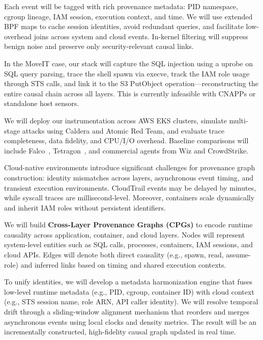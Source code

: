 Each event will be tagged with rich provenance metadata: PID namespace, cgroup lineage, IAM session, execution context, and time. We will use extended BPF maps to cache session identities, avoid redundant queries, and facilitate low-overhead joins across system and cloud events. In-kernel filtering will suppress benign noise and preserve only security-relevant causal links.

In the MoveIT case, our stack will capture the SQL injection using a uprobe on SQL query parsing, trace the shell spawn via execve, track the IAM role usage through STS calls, and link it to the S3 PutObject operation—reconstructing the entire causal chain across all layers. This is currently infeasible with CNAPPs or standalone host sensors.

We will deploy our instrumentation across AWS EKS clusters, simulate multi-stage attacks using Caldera and Atomic Red Team, and evaluate trace completeness, data fidelity, and CPU/I/O overhead. Baseline comparisons will include Falco~\cite{falco}, Tetragon~\cite{tetragon}, and commercial agents from Wiz and CrowdStrike.


Cloud-native environments introduce significant challenges for provenance graph construction: identity mismatches across layers, asynchronous event timing, and transient execution environments. CloudTrail events may be delayed by minutes, while syscall traces are millisecond-level. Moreover, containers scale dynamically and inherit IAM roles without persistent identifiers.

We will build \textbf{Cross-Layer Provenance Graphs (CPGs)} to encode runtime causality across application, container, and cloud layers. Nodes will represent system-level entities such as SQL calls, processes, containers, IAM sessions, and cloud APIs. Edges will denote both direct causality (e.g., spawn, read, assume-role) and inferred links based on timing and shared execution contexts.

To unify identities, we will develop a metadata harmonization engine that fuses low-level runtime metadata (e.g., PID, cgroup, container ID) with cloud context (e.g., STS session name, role ARN, API caller identity). We will resolve temporal drift through a sliding-window alignment mechanism that reorders and merges asynchronous events using local clocks and density metrics. The result will be an incrementally constructed, high-fidelity causal graph updated in real time.

